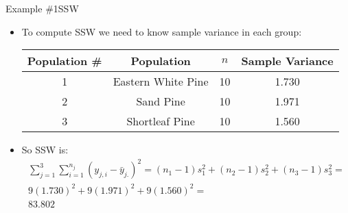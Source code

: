\documentclass[xcolor=dvipsnames]{beamer}
\begin{document}
\begin{frame}{Example \#1}{SSW}
	\begin{itemize}
	\item To compute SSW we need to know sample variance in each group:
		\begin{center}
			\begin{tabular}{|c|c|c|c|}
				\hline
				\textbf{Population \#} & \textbf{Population} & $n$ & \textbf{Sample Variance} \\
				\hline \hline
				1  & Eastern White Pine    &   10 &  1.730 \\ \hline 
				2 &  Sand Pine              & 10 &   1.971\\ \hline 
				3 &  Shortleaf Pine        &  10 &   1.560\\ \hline 
			\end{tabular}
		\end{center}
				\vspace{2mm}
	\item So SSW is:
	\begin{gather*}
		\sum_{j=1}^{3}\sum_{i = 1}^{n_j} (y_{j,i}-\bar{y}_{j.})^2 = (n_1-1)s_1^2 + (n_2-1)s_2^2 + (n_3-1)s_3^2 =\\ 
		9(1.730)^2 + 9(1.971)^2 + 9(1.560)^2 = \\
		83.802
	\end{gather*}
	\end{itemize}
\end{frame}
\end{document}
